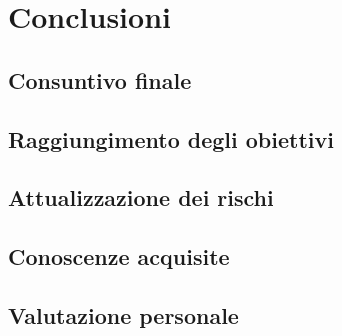 
\chapter{Conclusioni}
\label{cap:conclusioni}
\section{Consuntivo finale}

\section{Raggiungimento degli obiettivi}

\section{Attualizzazione dei rischi}

\section{Conoscenze acquisite}

\section{Valutazione personale}
